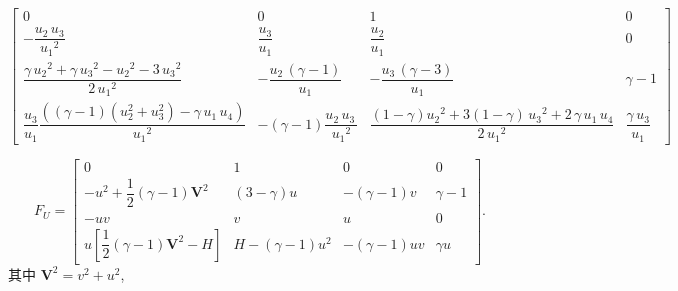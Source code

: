 \documentclass{book}
\begin{document}
\begin{equation}
    \begin{bmatrix}
        0                                                                                             & 0                                                        & 1                                                                                       & 0                           \\
        -\dfrac{u_2 \,u_3 }{{u_1 }^2 }                                                                & \dfrac{u_3 }{u_1 }                                       & \dfrac{u_2 }{u_1 }                                                                      & 0                           \\
        \dfrac{\gamma \,{u_2 }^2 +\gamma \,{u_3 }^2 -{u_2 }^2 -3\,{u_3 }^2 }{2\,{u_1 }^2 }            & -\dfrac{u_2 \,{\left(\gamma -1\right)}}{u_1 }            & -\dfrac{u_3 \,{\left(\gamma -3\right)}}{u_1 }                                           & \gamma -1                   \\
        \dfrac{u_3}{u_1}\dfrac{{\left((\gamma-1)(u_2^2+u_3^2)-\gamma \,u_1 \,u_4 \right)}}{{u_1 }^2 } & -{\left(\gamma -1\right)}\dfrac{u_2 \,u_3 \,}{{u_1 }^2 } & \dfrac{(1-\gamma){u_2 }^2 +3(1-\gamma)\,{u_3 }^2 +2\,\gamma \,u_1 \,u_4 }{2\,{u_1 }^2 } & \dfrac{\gamma \,u_3 }{u_1 }
    \end{bmatrix}
\end{equation}

\begin{equation}
    F_U=\begin{bmatrix}
        0                                                     & 1                  & 0               & 0        \\
        -u^{2}+\dfrac{1}{2}(\gamma-1) \mathbf{V}^{2}          & (3-\gamma) u       & -(\gamma-1) v   & \gamma-1 \\
        -u v                                                  & v                  & u               & 0        \\
        u\left[\dfrac{1}{2}(\gamma-1) \mathbf{V}^{2}-H\right] & H-(\gamma-1) u^{2} & -(\gamma-1) u v & \gamma u
    \end{bmatrix} .
\end{equation}
其中 $\mathbf{V}^2=v^2+u^2$,
\end{document}
